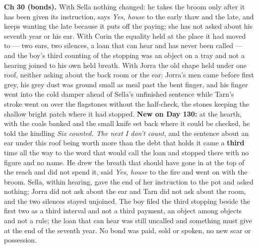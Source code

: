 \documentclass{design/chronicle}
\begin{document}
{\textbf{Ch 30 (bonds).} With Sella nothing changed: he takes the broom only after it has been given its instruction, says \emph{Yes, house} to the early thaw and the late, and keeps wanting the late because it puts off the paying; she has not asked about his seventh year or his ear. With Corin the equality held at the place it had moved to — two ears, two silences, a loan that can hear and has never been called — and the boy’s third counting of the stopping was an object on a tray and not a hearing joined to his own held breath. With Jorra the old shape held under one roof, neither asking about the back room or the ear: Jorra’s men came before first grey, his grey dust was ground small as meal past the bent finger, and his finger went into the cold damper ahead of Sella’s unfinished sentence while Tarn’s stroke went on over the flagstones without the half-check, the stones keeping the shallow bright patch where it had stopped. \textbf{New on Day 130:} at the hearth, with the coals banked and the small knife set back where it could be checked, he told the kindling \emph{Six counted. The next I don’t count}, and the sentence about an ear under this roof being worth more than the debt that holds it came a \textbf{third} time all the way to the word that would call the loan and stopped there with no figure and no name. He drew the breath that should have gone in at the top of the reach and did not spend it, said \emph{Yes, house} to the fire and went on with the broom. Sella, within hearing, gave the end of her instruction to the pot and asked nothing; Jorra did not ask about the ear and Tarn did not ask about the room, and the two silences stayed unjoined. The boy filed the third stopping beside the first two as a third interval and not a third payment, an object among objects and not a rule; the loan that can hear was still uncalled and something must give at the end of the seventh year. No bond was paid, sold or spoken, no new scar or possession.

}
\end{document}
